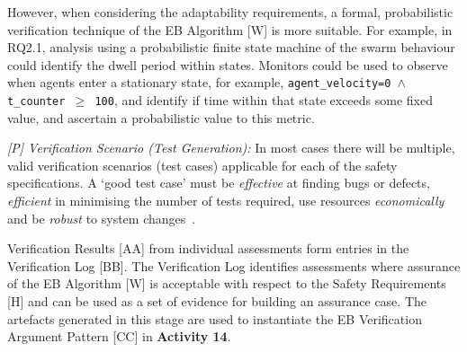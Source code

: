 \documentclass[runningheads]{llncs}
\begin{document}
%
However, when considering the adaptability requirements, a formal, probabilistic verification technique of the EB Algorithm [W] is more suitable. For example, in RQ2.1, analysis using a probabilistic finite state machine of the swarm behaviour could identify the dwell period within states. Monitors could be used to observe when agents enter a stationary state, for example, \texttt{agent\_velocity=0 $\land $  t\_counter  $\ge$ 100}, and identify if time within that state exceeds some fixed value, and ascertain a probabilistic value to this metric.

\emph{[P] Verification Scenario (Test Generation):} In most cases there will be multiple, valid verification scenarios (test cases) applicable for each of the safety specifications. A `good test case' must be \emph{effective} at finding bugs or defects, \emph{efficient} in minimising the number of tests required, use resources \emph{economically} and be \emph{robust} to system changes~\cite{Fewster1999}. 

Verification Results [AA] from individual assessments form entries in the Verification Log [BB]. The Verification Log identifies assessments where assurance of the EB Algorithm [W] is acceptable with respect to the Safety Requirements [H] and can be used as a set of evidence for building an assurance case. %
The artefacts generated in this stage are used to instantiate the EB Verification Argument Pattern [CC] in \textbf{Activity 14}.


\end{document}
